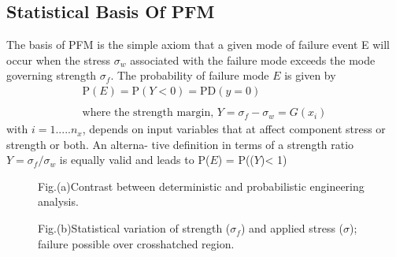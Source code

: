 \documentclass[12pt]{article}
\begin{document}
\subsection{Statistical Basis Of PFM}
The basis of PFM is the simple axiom that a given
mode of failure event E will occur when the stress $\sigma_w$
associated with the failure mode exceeds the mode
governing strength $\sigma_f$. The probability of failure mode
$E$ is given by
\begin{align*}
    \text{P}(E) = \text{P}(Y < 0) = \text{PD}(y=0)\\~\\
    \text{where the strength margin, }
    Y = \sigma_f - \sigma_w = G(x_i)
\end{align*}
with $i = 1 ..... n_x$, depends on input variables that at affect component stress or strength or both. An alterna-
tive definition in terms of a strength ratio $Y = \sigma_f/\sigma_w$
is equally valid and leads to P($E$) = P(($Y$)< 1)
\begin{figure}[H]
    \centering
    \captionsetup{labelformat=empty}
    \caption{Fig.(a)Contrast between deterministic and probabilistic engineering analysis.}  
\end{figure}
\begin{figure}[H]
    \centering
    \captionsetup{labelformat=empty}
    \caption{Fig.(b)Statistical variation of strength ($\sigma_f$) and applied stress ($\sigma$); failure possible over crosshatched region.}  
\end{figure}
\end{document}
